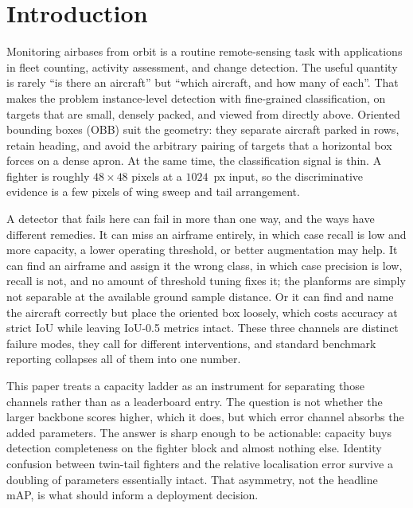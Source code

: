 \documentclass[conference]{IEEEtran}
\begin{document}
\section{Introduction}

Monitoring airbases from orbit is a routine remote-sensing task with applications
in fleet counting, activity assessment, and change detection. The useful quantity
is rarely ``is there an aircraft'' but ``which aircraft, and how many of each''.
That makes the problem instance-level detection with fine-grained classification,
on targets that are small, densely packed, and viewed from directly above.
Oriented bounding boxes (OBB) suit the geometry: they separate aircraft parked in
rows, retain heading, and avoid the arbitrary pairing of targets that a
horizontal box forces on a dense apron. At the same time, the classification
signal is thin. A fighter is roughly $48\times48$ pixels at a $1024$~px input, so
the discriminative evidence is a few pixels of wing sweep and tail arrangement.

A detector that fails here can fail in more than one way, and the ways have
different remedies. It can miss an airframe entirely, in which case recall is low
and more capacity, a lower operating threshold, or better augmentation may help.
It can find an airframe and assign it the wrong class, in which case precision is
low, recall is not, and no amount of threshold tuning fixes it; the planforms are
simply not separable at the available ground sample distance. Or it can find and
name the aircraft correctly but place the oriented box loosely, which costs
accuracy at strict IoU while leaving IoU-0.5 metrics intact. These three channels
are distinct failure modes, they call for different interventions, and standard
benchmark reporting collapses all of them into one number.

This paper treats a capacity ladder as an instrument for separating those
channels rather than as a leaderboard entry. The question is not whether the
larger backbone scores higher, which it does, but which error channel absorbs the
added parameters. The answer is sharp enough to be actionable: capacity buys
detection completeness on the fighter block and almost nothing else. Identity
confusion between twin-tail fighters and the relative localisation error survive
a doubling of parameters essentially intact. That asymmetry, not the headline
mAP, is what should inform a deployment decision.
\end{document}
